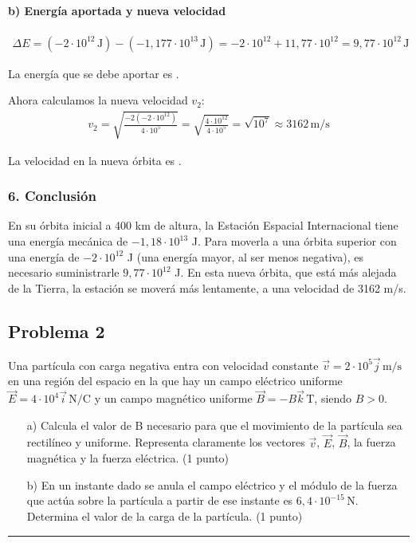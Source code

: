 \paragraph*{b) Energía aportada y nueva velocidad}
\begin{gather}
    \Delta E = (-2 \cdot 10^{12} \, \text{J}) - (-1,177 \cdot 10^{13} \, \text{J}) = -2 \cdot 10^{12} + 11,77 \cdot 10^{12} = 9,77 \cdot 10^{12} \, \text{J}
\end{gather}
\begin{cajaresultado}
    La energía que se debe aportar es .
\end{cajaresultado}
Ahora calculamos la nueva velocidad $v_2$:
\begin{gather}
    v_2 = \sqrt{\frac{-2(-2\cdot10^{12})}{4\cdot10^5}} = \sqrt{\frac{4\cdot10^{12}}{4\cdot10^5}} = \sqrt{10^7} \approx 3162 \, \text{m/s}
\end{gather}
\begin{cajaresultado}
    La velocidad en la nueva órbita es .
\end{cajaresultado}

\subsubsection*{6. Conclusión}
\begin{cajaconclusion}
En su órbita inicial a 400 km de altura, la Estación Espacial Internacional tiene una energía mecánica de $-1,18 \cdot 10^{13}$ J. Para moverla a una órbita superior con una energía de $-2 \cdot 10^{12}$ J (una energía mayor, al ser menos negativa), es necesario suministrarle $9,77 \cdot 10^{12}$ J. En esta nueva órbita, que está más alejada de la Tierra, la estación se moverá más lentamente, a una velocidad de 3162 m/s.
\end{cajaconclusion}
\newpage
\subsection{Problema 2}
\label{subsec:P2_2021_jul_ext}

\begin{cajaenunciado}
Una partícula con carga negativa entra con velocidad constante $\vec{v}=2\cdot10^5\vec{j}\,\text{m/s}$ en una región del espacio en la que hay un campo eléctrico uniforme $\vec{E}=4\cdot10^4\vec{i}\,\text{N/C}$ y un campo magnético uniforme $\vec{B}=-B\vec{k}\,\text{T}$, siendo $B>0$.
\begin{enumerate}
    \item[a)] Calcula el valor de B necesario para que el movimiento de la partícula sea rectilíneo y uniforme. Representa claramente los vectores $\vec{v}$, $\vec{E}$, $\vec{B}$, la fuerza magnética y la fuerza eléctrica. (1 punto)
    \item[b)] En un instante dado se anula el campo eléctrico y el módulo de la fuerza que actúa sobre la partícula a partir de ese instante es $6,4\cdot10^{-15}\,\text{N}$. Determina el valor de la carga de la partícula. (1 punto)
\end{enumerate}
\end{cajaenunciado}
\hrule

